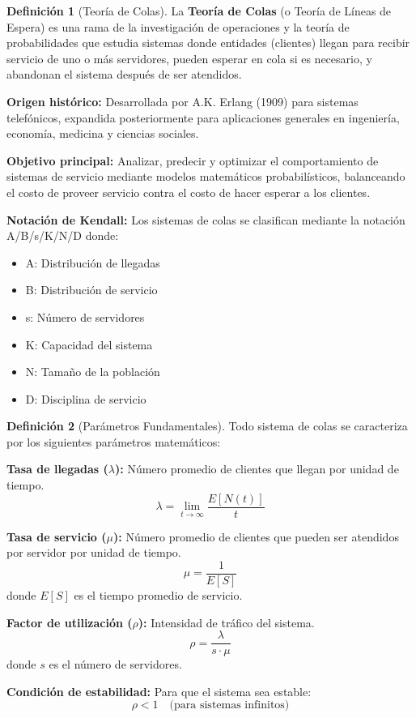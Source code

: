 \documentclass[12pt, a4paper, oneside]{book}
\theoremstyle{definition}
\newtheorem{definicion}{Definición}[chapter]
\begin{document}
\begin{definicion}[Teoría de Colas]
La \textbf{Teoría de Colas} (o Teoría de Líneas de Espera) es una rama de la investigación de operaciones y la teoría de probabilidades que estudia sistemas donde entidades (clientes) llegan para recibir servicio de uno o más servidores, pueden esperar en cola si es necesario, y abandonan el sistema después de ser atendidos.

\textbf{Origen histórico:} Desarrollada por A.K. Erlang (1909) para sistemas telefónicos, expandida posteriormente para aplicaciones generales en ingeniería, economía, medicina y ciencias sociales.

\textbf{Objetivo principal:} Analizar, predecir y optimizar el comportamiento de sistemas de servicio mediante modelos matemáticos probabilísticos, balanceando el costo de proveer servicio contra el costo de hacer esperar a los clientes.

\textbf{Notación de Kendall:} Los sistemas de colas se clasifican mediante la notación A/B/s/K/N/D donde:
\begin{itemize}
\item A: Distribución de llegadas
\item B: Distribución de servicio  
\item s: Número de servidores
\item K: Capacidad del sistema
\item N: Tamaño de la población
\item D: Disciplina de servicio
\end{itemize}
\end{definicion}

\begin{definicion}[Parámetros Fundamentales]
Todo sistema de colas se caracteriza por los siguientes parámetros matemáticos:

\textbf{Tasa de llegadas ($\lambda$):} Número promedio de clientes que llegan por unidad de tiempo.
$$\lambda = \lim_{t \to \infty} \frac{E[N(t)]}{t}$$

\textbf{Tasa de servicio ($\mu$):} Número promedio de clientes que pueden ser atendidos por servidor por unidad de tiempo.
$$\mu = \frac{1}{E[S]}$$
donde $E[S]$ es el tiempo promedio de servicio.

\textbf{Factor de utilización ($\rho$):} Intensidad de tráfico del sistema.
$$\rho = \frac{\lambda}{s \cdot \mu}$$
donde $s$ es el número de servidores.

\textbf{Condición de estabilidad:} Para que el sistema sea estable:
$$\rho < 1 \quad \text{(para sistemas infinitos)}$$
\end{definicion}
\end{document}
